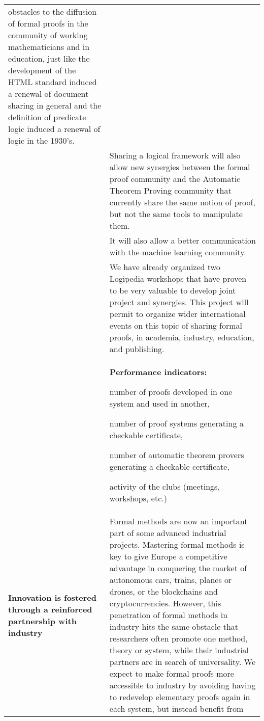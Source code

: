 \begin{longtable}{|p{}|p{}|}
obstacles to the diffusion of formal proofs in the community of
working mathematicians and in education, just like the development
of the HTML standard induced a renewal of document sharing in general
and the definition of predicate logic induced a renewal of logic in
the 1930's.\\
&
\hspace{0.4cm}
Sharing a logical framework will also allow new synergies between the
formal proof community and the Automatic Theorem Proving community
that currently share the same notion of proof, but not the same tools
to manipulate them.
\\
&
\hspace{0.4cm}
It will also allow a better communication with the machine learning community.\\
&
\hspace{0.4cm}
We have already organized two Logipedia workshops that have proven to
be very valuable to develop joint project and synergies.  This project
will permit to organize wider international events on this topic of
sharing formal proofs, in academia, industry, education, and
publishing.\\
&
\colorbox{color3}{\bf Performance indicators:}
\begin{compactitem}
  \item number of proofs developed in one system and used in another, 
  \item number of proof systems generating a checkable certificate, 
  \item number of automatic theorem provers generating a checkable certificate, 
  \item activity of the clubs (meetings, workshops, etc.)
\end{compactitem}
\\
\hline
{\bf Innovation is fostered through a reinforced partnership
with industry}
&
Formal methods are now an important part of some advanced industrial
projects. Mastering formal methods is key to give Europe a competitive
advantage in conquering the market of autonomous cars, trains, planes
or drones, or the blockchains and cryptocurrencies. However, this
penetration of formal methods in industry hits the same obstacle that
researchers often promote one method, theory or system, while their
industrial partners are in search of universality. We expect to make
formal proofs more accessible to industry by avoiding having to redevelop
elementary proofs again in each system, but instead benefit from

\end{longtable}
